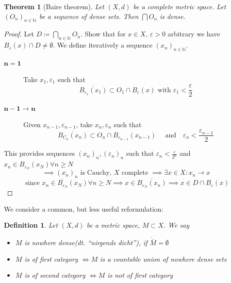 \documentclass[a4paper]{article}
\newcounter{lecref}[section]
\numberwithin{lecref}{section}
\newtheorem{theorem}[lecref]{Theorem}
\newtheorem{definition}[lecref]{Definition}
\newcommand{\dt}[1]{(dt. \enquote{\foreignlanguage{german}{#1}})}
\begin{document}
\begin{theorem}[Baire theorem]
	\label{theorem:1.23}
	Let $(X, d)$ be a complete metric space.
	Let $\left(O_n\right)_{n \in \mathbb N}$ be a sequence of dense sets.
	Then $\bigcap O_n$ is dense.
\end{theorem}
\begin{proof}
	Let $D \coloneqq \bigcap_{n \in \mathbb N} O_n$. Show that for $x \in X$, $\varepsilon > 0$ arbitrary we have $B_{\varepsilon}(x) \cap D \neq \emptyset$.
	We define iteratively a sequence $(x_n)_{n \in \mathbb N}$.

	\begin{description}
		\item[$\mathbf{n = 1}$] Take $x_1, \varepsilon_1$ such that
			\[ \overline{B_{\varepsilon_1}(x_1)} \subset O_1 \cap B_{\varepsilon}(x) \text{ with } \varepsilon_1 < \frac\varepsilon2 \]
		\item[$\mathbf{n-1\to n}$] Given $x_{n-1}, \varepsilon_{n-1}$, take $x_n, \varepsilon_n$ such that
			\[ \overline{B_{C_n}(x_n)} \subset O_n \cap B_{\varepsilon_{n-1}}(x_{n-1}) \quad \text{ and} \quad \varepsilon_n < \frac{\varepsilon_{n-1}}{2} \]
	\end{description}

	This provides sequences $(x_n)_n, (\varepsilon_n)_n$ such that $\varepsilon_n < \frac\varepsilon{2^n}$ and $x_n \in B_{\varepsilon_N}(x_N) \forall n \geq N$
	\[ \implies (x_n)_n \text{ is Cauchy, } X \text{ complete } \implies \exists x \in X: x_n \to x \]
	\[ \text{ since } x_n \in \overline{B_{\varepsilon_N}}(x_N) \forall n \geq N \implies x \in \overline{B_{\varepsilon_N}(x_n)} \implies x \in D \cap B_{\varepsilon}(x) \]
\end{proof}

We consider a common, but less useful reformulation:

\begin{definition}
	\label{defintion:1.24}
	Let $(X, d)$ be a metric space, $M \subset X$. We say
	\begin{itemize}
		\item $M$ is \emph{nowhere dense}\dt{nirgends dicht}, if $\mathring{\overline M} = \emptyset$
		\item $M$ is of \emph{first category} $\iff M$ is a countable union of nowhere dense sets
		\item $M$ is of \emph{second category} $\iff M$ is not of first category
	\end{itemize}
\end{definition}
\end{document}
